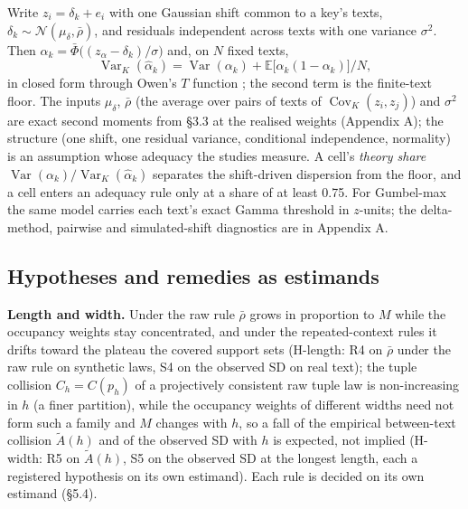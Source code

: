 \documentclass[11pt,letterpaper]{article}
\begin{document}
Write \(z_i = \delta_k + e_i\) with one Gaussian shift common to a key's texts, \(\delta_k \sim \mathcal N(\mu_\delta, \bar\rho)\), and residuals independent across texts with one variance \(\sigma^2\). Then \(\alpha_k = \bar\Phi\bigl((z_\alpha - \delta_k)/\sigma\bigr)\) and, on \(N\) fixed texts, \[\operatorname{Var}_K(\hat\alpha_k) = \operatorname{Var}(\alpha_k) + \mathbb{E}\bigl[\alpha_k(1-\alpha_k)\bigr]/N,\] in closed form through Owen's \(T\) function \citep{owen1956tables}; the second term is the finite-text floor. The inputs \(\mu_\delta\), \(\bar\rho\) (the average over pairs of texts of \(\operatorname{Cov}_K(z_i, z_j)\)) and \(\sigma^2\) are exact second moments from \S{}3.3 at the realised weights (Appendix A); the structure (one shift, one residual variance, conditional independence, normality) is an assumption whose adequacy the studies measure. A cell's \emph{theory share} \(\operatorname{Var}(\alpha_k)/\operatorname{Var}_K(\hat\alpha_k)\) separates the shift-driven dispersion from the floor, and a cell enters an adequacy rule only at a share of at least 0.75. For Gumbel-max the same model carries each text's exact Gamma threshold in \(z\)-units; the delta-method, pairwise and simulated-shift diagnostics are in Appendix A.

\hypertarget{hypotheses-and-remedies-as-estimands}{%
\subsection{Hypotheses and remedies as estimands}\label{hypotheses-and-remedies-as-estimands}}

\textbf{Length and width.} Under the raw rule \(\bar\rho\) grows in proportion to \(M\) while the occupancy weights stay concentrated, and under the repeated-context rules it drifts toward the plateau the covered support sets (H-length: R4 on \(\bar\rho\) under the raw rule on synthetic laws, S4 on the observed SD on real text); the tuple collision \(C_h = C(p_h)\) of a projectively consistent raw tuple law is non-increasing in \(h\) (a finer partition), while the occupancy weights of different widths need not form such a family and \(M\) changes with \(h\), so a fall of the empirical between-text collision \(\tilde A(h)\) and of the observed SD with \(h\) is expected, not implied (H-width: R5 on \(\tilde A(h)\), S5 on the observed SD at the longest length, each a registered hypothesis on its own estimand). Each rule is decided on its own estimand (\S{}5.4).
\end{document}
